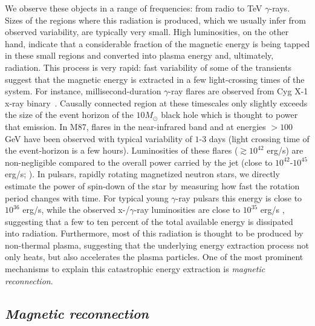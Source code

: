 We observe these objects in a range of frequencies: from radio to TeV $\gamma$-rays. Sizes of the regions where this radiation is produced, which we usually infer from observed variability, are typically very small. High luminosities, on the other hand, indicate that a considerable fraction of the magnetic energy is being tapped in these small regions and converted into plasma energy and, ultimately, radiation. This process is very rapid: fast variability of some of the transients suggest that the magnetic energy is extracted in a few light-crossing times of the system. For instance, millisecond-duration $\gamma$-ray flares are observed from Cyg X-1 x-ray binary~\citep{2003MNRAS.343L..84G}. Causally connected region at these timescales only slightly exceeds the size of the event horizon of the $10 M_\odot$ black hole which is thought to power that emission. In M87, flares in the near-infrared band and at energies $>100$ GeV have been observed with typical variability of $1\text{-}3$ days \citep{2006Sci...314.1424A,2012ApJ...746..151A} (light crossing time of the event-horizon is a few hours). Luminosities of these flares ($\gtrsim 10^{42}$ erg/s) are non-negligible compared to the overall power carried by the jet (close to $10^{42}\text{-}10^{45}$ erg/s; \citealt{2012ApJ...746..151A,2016MNRAS.457.3801P}). In pulsars, rapidly rotating magnetized neutron stars, we directly estimate the power of spin-down of the star by measuring how fast the rotation period changes with time. For typical young $\gamma$-ray pulsars this energy is close to $10^{36}$ erg/s, while the observed x-/$\gamma$-ray luminosities are close to $10^{35}$ erg/s \citep{2013ApJS..208...17A}, suggesting that a few to ten percent of the total available energy is dissipated into radiation. Furthermore, most of this radiation is thought to be produced by non-thermal plasma, suggesting that the underlying energy extraction process not only heats, but also accelerates the plasma particles. One of the most prominent mechanisms to explain this catastrophic energy extraction is \emph{magnetic reconnection}. 

\subsection*{\small \it Magnetic reconnection}

